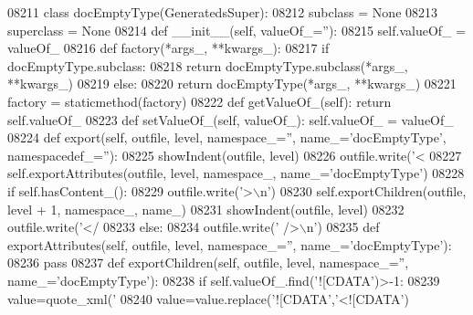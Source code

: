 \begin{DoxyCode}
{{{{{{{{{{{{{{{{{{{{{{{{{{{{{{{{{{{{{{{{{{{{{{{{{{{{{{{{{{{{{{{{{{{{{{{{{{{{{{{{{{{{{{{{{{{{{{{{{{{{{{{{{{{{{{{{{{{{{{{{{{{{{{{{{{{{{{{{{{{{{{{{{{{{{{{{{{{{{{{{{{{{{{{{{{{{{{{{{{{{{{{{{{{{{{{{{{{{{{{{{{{{{{{{{{{{{{{{{{{{{{{{{{{{{{{{{{{{{{{{{{{{{{{{{{{{{{{{{{{{{{{{{{{{{{{{{{{{{{{{{{{{{{{{{{{{{{{{{{{{{{{{{{{{{{{{{{{{{{{{{{{{{{{{{{{{{{{{{{{{{{{{{{{{{{{{{{{{{{{{{{{{{{{{{{{{{{{{{{{{{{{{{{{{{{{{{{{{{{{{{{{{{{{{{{{{{{{{{{{{{{{{{{{{{{{{{{{{{{{{{{{{{{{{{{{{{{{{{{{{{{{{{{{{{{{{{{{{{{{{{{{{{{{{{{{{{{{{{{{{{{{08211 \textcolor{keyword}{class }docEmptyType(GeneratedsSuper):
08212     subclass = \textcolor{keywordtype}{None}
08213     superclass = \textcolor{keywordtype}{None}
08214     \textcolor{keyword}{def }__init__(self, valueOf\_=''):
08215         self.valueOf_ = valueOf\_
08216     \textcolor{keyword}{def }factory(*args\_, **kwargs\_):
08217         \textcolor{keywordflow}{if} docEmptyType.subclass:
08218             \textcolor{keywordflow}{return} docEmptyType.subclass(*args\_, **kwargs\_)
08219         \textcolor{keywordflow}{else}:
08220             \textcolor{keywordflow}{return} docEmptyType(*args\_, **kwargs\_)
08221     factory = staticmethod(factory)
08222     \textcolor{keyword}{def }getValueOf_(self): \textcolor{keywordflow}{return} self.valueOf\_
08223     \textcolor{keyword}{def }setValueOf_(self, valueOf\_): self.valueOf\_ = valueOf\_
08224     \textcolor{keyword}{def }export(self, outfile, level, namespace\_='', name\_='docEmptyType', namespacedef\_=''):
08225         showIndent(outfile, level)
08226         outfile.write(\textcolor{stringliteral}{'<%
08227         self.exportAttributes(outfile, level, namespace\_, name\_=\textcolor{stringliteral}{'docEmptyType'})
08228         \textcolor{keywordflow}{if} self.hasContent_():
08229             outfile.write(\textcolor{stringliteral}{'>\(\backslash\)n'})
08230             self.exportChildren(outfile, level + 1, namespace\_, name\_)
08231             showIndent(outfile, level)
08232             outfile.write(\textcolor{stringliteral}{'</%
08233         \textcolor{keywordflow}{else}:
08234             outfile.write(\textcolor{stringliteral}{' />\(\backslash\)n'})
08235     \textcolor{keyword}{def }exportAttributes(self, outfile, level, namespace\_='', name\_='docEmptyType'):
08236         \textcolor{keywordflow}{pass}
08237     \textcolor{keyword}{def }exportChildren(self, outfile, level, namespace\_='', name\_='docEmptyType'):
08238         \textcolor{keywordflow}{if} self.valueOf\_.find(\textcolor{stringliteral}{'![CDATA'})>-1:
08239             value=quote_xml(\textcolor{stringliteral}{'%
08240             value=value.replace(\textcolor{stringliteral}{'![CDATA'},\textcolor{stringliteral}{'<![CDATA'})
}}}}}}}}}}}}}}}}}}}}}}}}}}}}}}}}}}}}}}}}}}}}}}}}}}}}}}}}}}}}}}}}}}}}}}}}}}}}}}}}}}}}}}}}}}}}}}}}}}}}}}}}}}}}}}}}}}}}}}}}}}}}}}}}}}}}}}}}}}}}}}}}}}}}}}}}}}}}}}}}}}}}}}}}}}}}}}}}}}}}}}}}}}}}}}}}}}}}}}}}}}}}}}}}}}}}}}}}}}}}}}}}}}}}}}}}}}}}}}}}}}}}}}}}}}}}}}}}}}}}}}}}}}}}}}}}}}}}}}}}}}}}}}}}}}}}}}}}}}}}}}}}}}}}}}}}}}}}}}}}}}}}}}}}}}}}}}}}}}}}}}}}}}}}}}}}}}}}}}}}}}}}}}}}}}}}}}}}}}}}}}}}}}}}}}}}}}}}}}}}}}}}}}}}}}}}}}}}}}}}}}}}}}}}}}}}}}}}}}}}}}}}}}}}}}}}}}}}}}}}}}}}}}}}}}}}}}}}}}}}}}}}}}}}}}}}}}}}}}}}}}}}}}
\end{DoxyCode}
